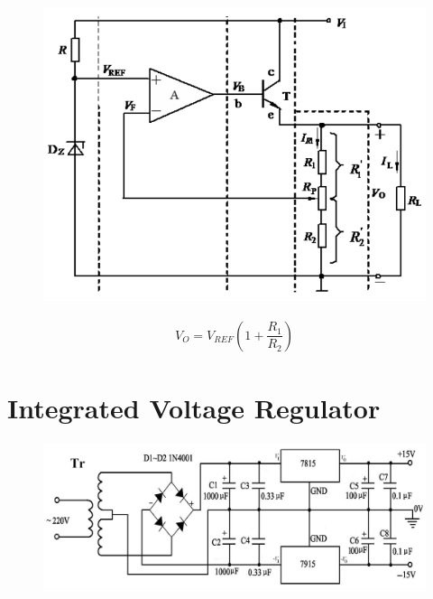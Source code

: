 \begin{figure}[H]
  \centering
  \includegraphics[width=\linewidth]{figures/Series-Feedback-Voltage-Regulator}
\end{figure}

\begin{equation*}
  \begin{aligned}
    V_O = V_{REF} \left( 1 + \dfrac{R_1}{R_2}  \right)
  \end{aligned}
\end{equation*}

\section{Integrated Voltage Regulator}

\begin{figure}[H]
  \centering
  \includegraphics[width=\linewidth]{figures/Integrated-Voltage-Regulator}
\end{figure}

